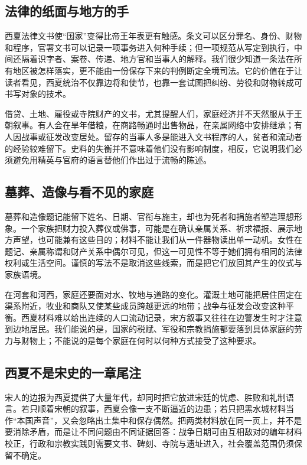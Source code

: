 \subsection{法律的纸面与地方的手}

西夏法律文书使“国家”变得比帝王年表更有触感。条文可以区分罪名、身份、财物和程序，官署文书可以记录一项事务进入何种手续；但一项规范从写定到执行，中间还隔着识字者、案卷、传递、地方官和当事人的解释。我们很少知道一条法在所有地区被怎样落实，更不能由一份保存下来的判例断定全境司法。它的价值在于让读者看见，西夏统治不仅靠边将和使节，也靠一套试图把纠纷、劳役和财物转成可书写对象的技术。

借贷、土地、雇役或寺院财产的文书，尤其提醒人们，家庭经济并不天然服从于王朝叙事。有人会在旱年借粮，在商路畅通时出售物品，在亲属网络中安排继承；有人因战事或征发改变居处。留存的当事人多是能进入文书程序的人，贫者和流动者的经验较难留下。史料的失衡并不意味着他们没有影响制度，相反，它说明我们必须避免用精英与官府的语言替他们作出过于流畅的陈述。

\subsection{墓葬、造像与看不见的家庭}

墓葬和造像题记能留下姓名、日期、官衔与施主，却也为死者和捐施者塑造理想形象。一个家族把财力投入葬仪或佛事，可能是在确认亲属关系、祈求福报、展示地方声望，也可能兼有这些目的；材料不能让我们从一件器物读出单一动机。女性在题记、亲属称谓和财产关系中偶尔可见，但这一可见性不等于她们拥有相同的法律权利或生活空间。谨慎的写法不是取消这些线索，而是把它们放回其产生的仪式与家族语境。

在河套和河西，家庭还要面对水、牧地与道路的变化。灌溉土地可能把居住固定在渠系附近，牧业和商队又使某些成员跨越更远的地带；战争与征发会改变这种平衡。西夏材料难以给出连续的人口流动记录，宋方叙事又往往在边警发生时才注意到边地居民。我们能说的是，国家的税赋、军役和宗教捐施都要落到具体家庭的劳力与财物上；不能说的是每个家庭在何时以何种方式接受了这种要求。

\subsection{西夏不是宋史的一章尾注}

宋人的边报为西夏提供了大量年代，却同时把它放进宋廷的忧虑、胜败和礼制语言。若只顺着宋朝的叙事，西夏会像一支不断逼近的边患；若只把黑水城材料当作“本国声音”，又会忽略出土集中和保存偶然。把两类材料放在同一页上，并不是要消除矛盾，而是让不同问题由不同证据回答：战争日期可由互相敌对的编年材料校正，行政和宗教实践则需要文书、碑刻、寺院与遗址进入，社会覆盖范围仍须保留不确定。

